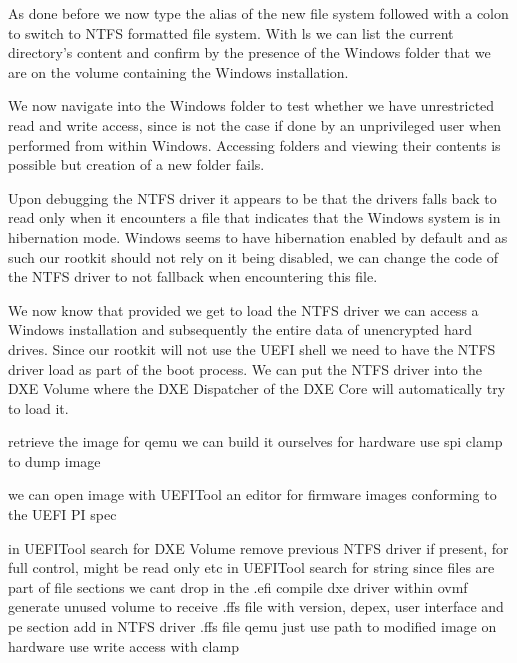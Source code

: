 As done before we now type the alias of the new file system followed with a colon to switch to NTFS formatted file system. With ls we can list the current directory's content and confirm by the presence of the Windows folder that we are on the volume containing the Windows installation.


We now navigate into the Windows folder to test whether we have unrestricted read and write access, since is not the case if done by an unprivileged user when performed from within Windows. Accessing folders and viewing their contents is possible but creation of a new folder fails.

Upon debugging the NTFS driver it appears to be that the drivers falls back to read only when it encounters a file that indicates that the Windows system is in hibernation mode. Windows seems to have hibernation enabled by default and as such our rootkit should not rely on it being disabled, we can change the code of the NTFS driver to not fallback when encountering this file.

We now know that provided we get to load the NTFS driver we can access a Windows installation and subsequently the entire data of unencrypted hard drives. Since our rootkit will not use the UEFI shell we need to have the NTFS driver load as part of the boot process.
We can put the NTFS driver into the DXE Volume where the DXE Dispatcher of the DXE Core will automatically try to load it.

retrieve the image
for qemu we can build it ourselves
for hardware use spi clamp to  dump image

we can open image with UEFITool
an editor for firmware images conforming to the UEFI PI spec \cite{uefitool}

in UEFITool search for DXE Volume
remove previous NTFS driver if present, for full control, might be read only etc
in UEFITool search for string
since files are part of file sections we cant drop in the .efi
compile dxe driver within ovmf
generate unused volume to receive .ffs file with version, depex, user interface and pe section
add in NTFS driver .ffs file
qemu just use path to modified image
on hardware use write access with clamp

